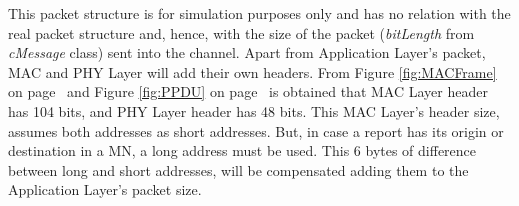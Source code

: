 This packet structure is for simulation purposes only and has no relation with the real packet structure and, hence, with the size of the 
packet (\textit{bitLength} from \textit{cMessage} class) sent into the channel. Apart from Application Layer's packet, \ac{MAC} and 
\ac{PHY} Layer will add their own headers. From Figure \ref{fig:MACFrame} on page~\pageref{fig:MACFrame} and Figure \ref{fig:PPDU} on 
page~\pageref{fig:PPDU} is obtained that \ac{MAC} Layer header has 104 bits, and \ac{PHY} Layer header has 48 bits. This \ac{MAC} Layer's
header size, assumes both addresses as short addresses. But, in case a report has its origin or destination in a \ac{MN}, a long address 
must be used. This 6 bytes of difference between long and short addresses, will be compensated adding them to the Application Layer's packet size.


